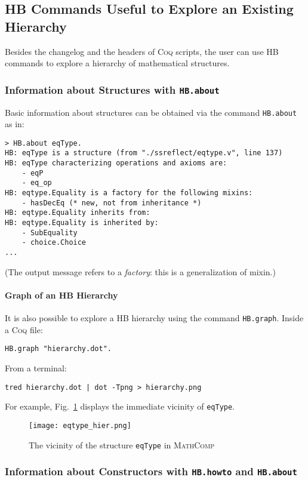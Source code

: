 \documentclass{article}
\def\coq{\textsc{Coq}}
\def\mathcomp{\textsc{MathComp}}
\def\hb{\textsc{HB}}
\def\coqin#1{\texttt{#1}}
\def\newterm#1{{\sl #1}}
\begin{document}
\subsection{\hb{} Commands Useful to Explore an Existing Hierarchy}

Besides the changelog and the headers of \coq{} scripts, the user can use
\hb{} commands to explore a hierarchy of mathematical structures.

\subsubsection{Information about Structures with \coqin{HB.about}}
\label{sec:info_structures}

Basic information about structures can be obtained via the command
\coqin{HB.about} as in:
\begin{verbatim}
> HB.about eqType.
HB: eqType is a structure (from "./ssreflect/eqtype.v", line 137)
HB: eqType characterizing operations and axioms are:
    - eqP
    - eq_op
HB: eqtype.Equality is a factory for the following mixins:
    - hasDecEq (* new, not from inheritance *)
HB: eqtype.Equality inherits from:
HB: eqtype.Equality is inherited by:
    - SubEquality
    - choice.Choice
...
\end{verbatim}
(The output message refers to a \newterm{factory}: this is a
generalization of mixin.)

\paragraph{Graph of an \hb{} Hierarchy}

It is also possible to explore a \hb{} hierarchy using the command
\coqin{HB.graph}. Inside a \coq{} file:
\begin{verbatim}
HB.graph "hierarchy.dot".
\end{verbatim}
From a terminal:
\begin{verbatim}
tred hierarchy.dot | dot -Tpng > hierarchy.png
\end{verbatim}
For example, Fig.~\ref{fig:eqtype_hier} displays the immediate
vicinity of \coqin{eqType}.

\begin{figure}[htbp]
\centering
\texttt{[image: eqtype\_hier.png]}
\caption{The vicinity of the structure {\tt eqType} in \mathcomp{}}
\label{fig:eqtype_hier}
\end{figure}

\subsubsection{Information about Constructors with \coqin{HB.howto} and \coqin{HB.about}}
\label{sec:info_constructors}
\end{document}
